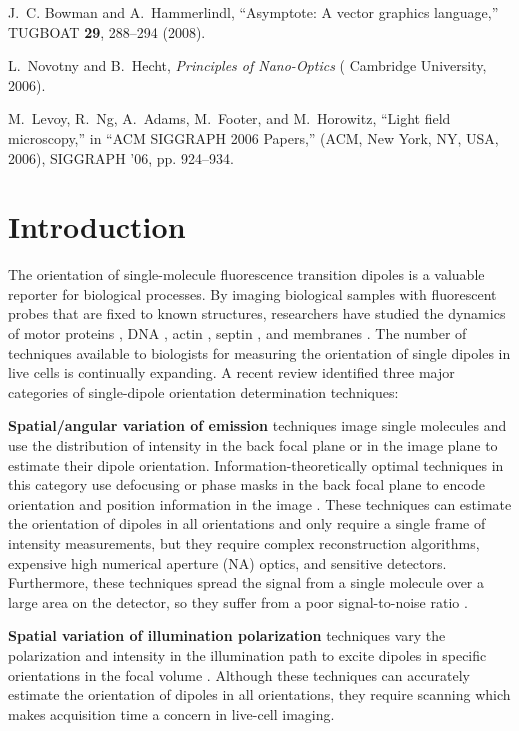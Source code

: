 \documentclass[10pt]{article}
\begin{document}
\begin{thebibliography}{10}
J.~C. Bowman and A.~Hammerlindl, \enquote{Asymptote: A vector graphics
  language,} TUGBOAT \textbf{29}, 288--294 (2008).

L.~Novotny and B.~Hecht, \emph{Principles of Nano-Optics} (\hypertarget{press}
  {{\color{urlblue}
Cambridge University}}, 2006).

M.~Levoy, R.~Ng, A.~Adams, M.~Footer, and M.~Horowitz, \enquote{Light field
  microscopy,} in \enquote{ACM SIGGRAPH 2006 Papers,}  (ACM, New York, NY, USA,
  2006), SIGGRAPH '06, pp. 924--934.

\end{thebibliography}


\section{Introduction}\label{sec:intro}
The orientation of single-molecule fluorescence transition dipoles is a valuable
reporter for biological processes. By imaging biological samples with
fluorescent probes that are fixed to known structures, researchers have studied
the dynamics of motor proteins \cite{peterman2001, forkey2003}, DNA
\cite{backer2016}, actin \cite{mehta2016}, septin \cite{demay2011,
  mcquilken2017}, and membranes \cite{anantharam2010}. The number of techniques
available to biologists for measuring the orientation of single dipoles in live
cells is continually expanding. A recent review \cite{backlund2014} identified
three major categories of single-dipole orientation determination techniques:

\textbf{Spatial/angular variation of emission} techniques image single molecules
and use the distribution of intensity in the back focal plane \cite{lieb2004} or
in the image plane \cite{backer2014} to estimate their dipole
orientation. Information-theoretically optimal techniques in this category use
defocusing or phase masks in the back focal plane to encode orientation and
position information in the image \cite{agrawal2012}. These techniques can
estimate the orientation of dipoles in all orientations and only require a
single frame of intensity measurements, but they require complex reconstruction
algorithms, expensive high numerical aperture (NA) optics, and sensitive
detectors. Furthermore, these techniques spread the signal from a single
molecule over a large area on the detector, so they suffer from a poor
signal-to-noise ratio \cite{toprak2006}.

\textbf{Spatial variation of illumination polarization} techniques vary the
polarization and intensity in the illumination path to excite dipoles in
specific orientations in the focal volume \cite{debarre2004}. Although these
techniques can accurately estimate the orientation of dipoles in all
orientations, they require scanning which makes acquisition time a concern in
live-cell imaging.
\end{document}
